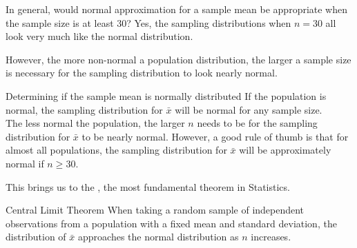 \begin{examplewrap}
\begin{nexample}{In general, would normal approximation for a sample mean be appropriate when the sample size is at least 30?}
Yes, the sampling distributions when $n = 30$ all look very much like the normal distribution.

However, the more non-normal a population distribution, the larger a sample size is necessary for the sampling distribution to look nearly normal.
\end{nexample}
\end{examplewrap}

\begin{onebox}{Determining if the sample mean is normally distributed}
If the population is normal, the sampling distribution for $\bar{x}$ will be normal for any sample size. \\[2mm]
The less normal the population, the larger $n$ needs to be for the sampling distribution for $\bar{x}$ to be nearly normal. However, a good rule of thumb is that for almost all populations, the sampling distribution for $\bar{x}$ will be approximately normal if $n \ge 30$.\end{onebox}

This brings us to the , the most fundamental theorem in Statistics.

\begin{onebox}{Central Limit Theorem}
When taking a random sample of independent observations from a population with a fixed mean and standard deviation, the distribution of $\bar{x}$ approaches the normal distribution as $n$ increases.\end{onebox}

\D{\newpage}

